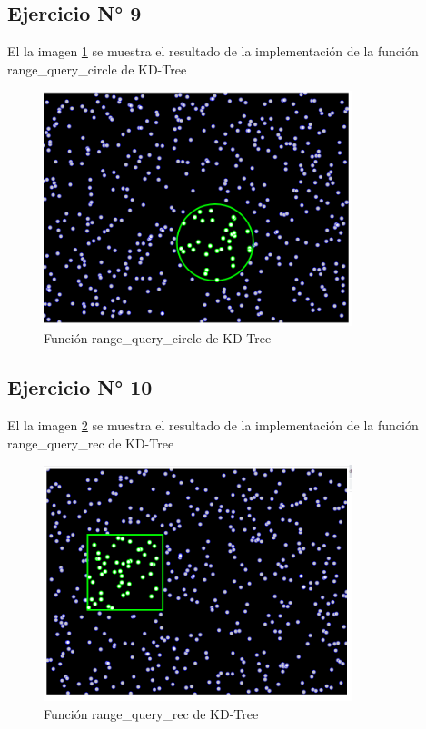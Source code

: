 \documentclass{article}
\begin{document}
\subsection{Ejercicio N° 9}
El la imagen \ref{fig:ejercicio_09} se muestra el resultado de la implementación de la función range_query_circle de KD-Tree
\begin{figure}[h!]
	\centering
	\includegraphics[width=0.8\textwidth]{img/ejercicio_09.png}
	\caption{Función range_query_circle de KD-Tree}
	\label{fig:ejercicio_09}
\end{figure}

\subsection{Ejercicio N° 10}
El la imagen \ref{fig:ejercicio_10} se muestra el resultado de la implementación de la función range_query_rec de KD-Tree
\begin{figure}[h!]
	\centering
	\includegraphics[width=0.8\textwidth]{img/ejercicio_10.png}
	\caption{Función range_query_rec de KD-Tree}
	\label{fig:ejercicio_10}
\end{figure}
\end{document}
